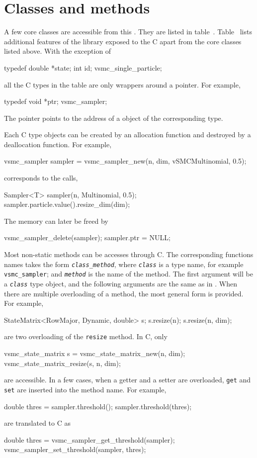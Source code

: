 \section{Classes and methods}
\label{app:sec:Classes and methods}

A few core classes are accessible from this \api. They are listed in
table~. Table~ lists additional
features of the library exposed to the C \api apart from the core classes
listed above. With the exception of
\begin{ccode}
  typedef {
      double *state;
      int id;
  } vsmc_single_particle;
\end{ccode}
all the C types in the table are only wrappers around a pointer. For example,
\begin{ccode}
  typedef {
      void *ptr;
  } vsmc_sampler;
\end{ccode}
The pointer points to the address of a \cpp object of the corresponding type.

Each C type objects can be created by an allocation function and destroyed by a
deallocation function. For example,
\begin{ccode}
  vsmc_sampler sampler = vsmc_sampler_new(n, dim, vSMCMultinomial, 0.5);
\end{ccode}
corresponds to the \cpp calls,
\begin{cppcode}
  Sampler<T> sampler(n, Multinomial, 0.5);
  sampler.particle.value().resize_dim(dim);
\end{cppcode}
The memory can later be freed by
\begin{ccode}
  vsmc_sampler_delete(sampler);
  sampler.ptr = NULL;
\end{ccode}
Most non-static methods can be accesses through C. The corresponding functions
names takes the form
\texttt{\textcolor{MRed}{\textit{class}}\_\textcolor{MRed}{\textit{method}}},
where \texttt{\textcolor{MRed}{\textit{class}}} is a type name, for example
\verb|vsmc_sampler|; and \texttt{\textcolor{MRed}{\textit{method}}} is the name
of the method. The first argument will be a
\texttt{\textcolor{MRed}{\textit{class}}} type object, and the following
arguments are the same as in \cpp. When there are multiple overloading of a
method, the most general form is provided. For example,
\begin{cppcode}
  StateMatrix<RowMajor, Dynamic, double> s;
  s.resize(n);
  s.resize(n, dim);
\end{cppcode}
are two overloading of the \verb|resize| method. In C, only
\begin{ccode}
  vsmc_state_matrix s = vsmc_state_matrix_new(n, dim);
  vsmc_state_matrix_resize(s, n, dim);
\end{ccode}
are accessible. In a few cases, when a getter and a setter are overloaded,
\verb|get| and \verb|set| are inserted into the method name. For example,
\begin{cppcode}
  double thres = sampler.threshold();
  sampler.threshold(thres);
\end{cppcode}
are translated to C as
\begin{ccode}
  double thres = vsmc_sampler_get_threshold(sampler);
  vsmc_sampler_set_threshold(sampler, thres);
\end{ccode}

